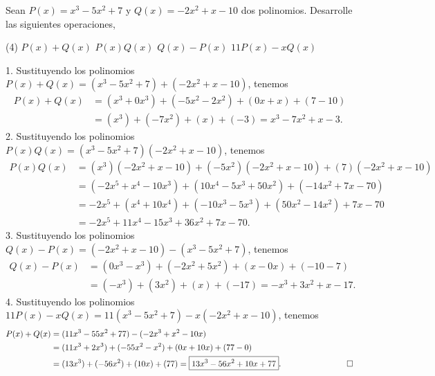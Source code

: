 \begin{example}
    Sean $P(x) = x^3 - 5x^2 + 7$ y $Q(x) = -2x^2 + x - 10$ dos polinomios.
    Desarrolle las siguientes operaciones,
    \begin{tasks}(4)
        \task $P(x) + Q(x)$
        \task $P(x) Q(x)$
        \task $Q(x) - P(x)$
        \task $11 P(x) - x Q(x)$
    \end{tasks}
\end{example}
\begin{solution}
    1. Sustituyendo los polinomios $P(x) + Q(x) = (x^3 - 5x^2 + 7) + (-2x^2 + x - 10)$, tenemos
    \begin{align*}
        P(x) + Q(x) &= (x^3 + 0x^3) + (-5 x^2 - 2x^2) + (0x + x) + (7 - 10)\\
        &= (x^3) + (-7x^2) + (x) + (-3) = \boxed{x^3 - 7x^2 + x - 3}.
    \end{align*}
    2. Sustituyendo los polinomios $P(x) Q(x) = (x^3 - 5x^2 + 7)(-2x^2 + x - 10)$, tenemos
    \begin{align*}
        P(x) Q(x) &= (x^3)(-2x^2 + x - 10) + (-5x^2)(-2x^2 + x - 10) + (7)(-2x^2 + x - 10)\\
        &= (-2x^5 + x^4 - 10x^3) + (10x^4 - 5x^3 + 50x^2) + (-14x^2 + 7x - 70)\\
        &= -2x^5 + (x^4 + 10x^4) + ( - 10x^3 - 5x^3) + (50x^2 -14x^2) + 7x - 70\\
        &= \boxed{-2x^5 + 11x^4 - 15x^3 + 36x^2 + 7x - 70}.
    \end{align*}
    3. Sustituyendo los polinomios $Q(x) - P(x) = (-2x^2 + x - 10) - (x^3 - 5x^2 + 7)$, tenemos
    \begin{align*}
        Q(x) - P(x) &= (0x^3 - x^3) + (- 2x^2 + 5 x^2) + (x - 0x) + (- 10 - 7)\\
        &= (-x^3) + (3x^2) + (x) + (-17) = \boxed{-x^3 + 3x^2 + x - 17}.
    \end{align*}
    4. Sustituyendo los polinomios $11P(x) - xQ(x) = 11(x^3 - 5x^2 + 7) - x(-2x^2 + x - 10)$, tenemos
    \begin{align*}
        P(x) + Q(x) &= (11x^3 - 55x^2 + 77) - (-2x^3 + x^2 - 10x)\\
        &= (11x^3 + 2x^3) + (-55 x^2 - x^2) + (0x + 10x) + (77 - 0)\\
        &= (13x^3) + (-56x^2) + (10x) + (77) = \boxed{13x^3 - 56x^2 + 10x + 77}.\qquad\qquad\qquad\qedhere
    \end{align*}
\end{solution}


